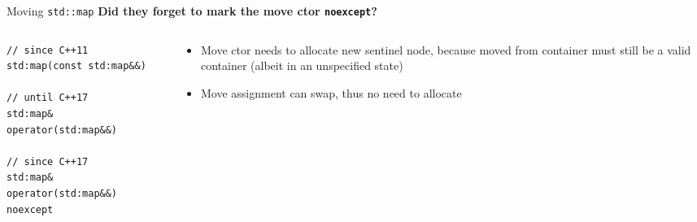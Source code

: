 \begin{frame}[fragile]{Moving \texttt{std::map}}
    \textbf{Did they forget to mark the move ctor \texttt{noexcept}?} 

    \begin{columns}[t]
        \begin{column}{.45\textwidth}
            \begin{lstlisting}[numbers=none]
// since C++11
std:map(const std:map&&)

// until C++17
std:map& operator(std:map&&)

// since C++17
std:map& operator(std:map&&) noexcept
            \end{lstlisting}
        \end{column}
        \begin{column}{.5\textwidth}
            \begin{itemize}
                \item<2> Move ctor needs to allocate new sentinel node, because moved from container must still be a valid container (albeit in an unspecified state)
                \item<2> Move assignment can swap, thus no need to allocate
            \end{itemize}
        \end{column}
    \end{columns}

\end{frame}

